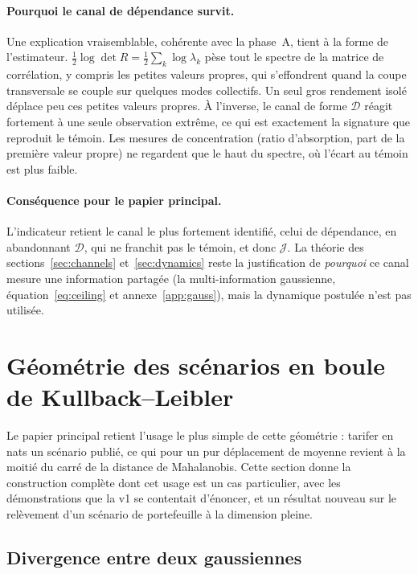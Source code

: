 \documentclass[11pt]{article}
\theoremstyle{definition}
\theoremstyle{remark}
\newcommand{\JJ}{\mathcal{J}}
\newcommand{\DD}{\mathcal{D}}
\begin{document}
\paragraph{Pourquoi le canal de dépendance survit.} Une explication
vraisemblable, cohérente avec la phase~A, tient à la forme de l'estimateur.
$\tfrac12\log\det R=\tfrac12\sum_k\log\lambda_k$ pèse tout le spectre de la
matrice de corrélation, y compris les petites valeurs propres, qui s'effondrent
quand la coupe transversale se couple sur quelques modes collectifs. Un seul
gros rendement isolé déplace peu ces petites valeurs propres. À l'inverse, le
canal de forme $\DD$ réagit fortement à une seule observation extrême, ce qui
est exactement la signature que reproduit le témoin. Les mesures de
concentration (ratio d'absorption, part de la première valeur propre) ne
regardent que le haut du spectre, où l'écart au témoin est plus faible.

\paragraph{Conséquence pour le papier principal.} L'indicateur retient le canal
le plus fortement identifié, celui de dépendance, en abandonnant $\DD$, qui ne
franchit pas le témoin, et donc $\JJ$. La théorie des
sections~\ref{sec:channels} et~\ref{sec:dynamics} reste la justification de
\emph{pourquoi} ce canal mesure une information partagée (la
multi-information gaussienne, équation~\eqref{eq:ceiling} et annexe~\ref{app:gauss}),
mais la dynamique postulée n'est pas utilisée.

\section{Géométrie des scénarios en boule de Kullback--Leibler}
\label{sec:stress}

Le papier principal retient l'usage le plus simple de cette géométrie : tarifer
en nats un scénario publié, ce qui pour un pur déplacement de moyenne revient à
la moitié du carré de la distance de Mahalanobis. Cette section donne la
construction complète dont cet usage est un cas particulier, avec les
démonstrations que la v1 se contentait d'énoncer, et un résultat nouveau sur le
relèvement d'un scénario de portefeuille à la dimension pleine.

\subsection{Divergence entre deux gaussiennes}
\end{document}
